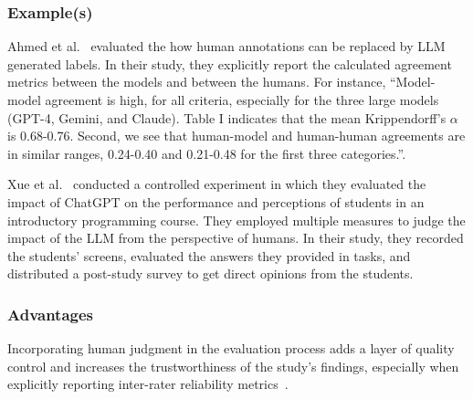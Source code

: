 \subsubsection{Example(s)}

Ahmed et al.~\cite{DBLP:journals/corr/abs-2408-05534} evaluated the how human annotations can be replaced by LLM generated labels.
In their study, they explicitly report the calculated agreement metrics between the models and between the humans.
For instance, ``Model-model agreement is high, for all criteria, especially for the three large models (GPT-4, Gemini, and Claude). Table I indicates that the mean Krippendorff’s $\alpha$ is 0.68-0.76. 
Second, we see that human-model and human-human agreements are in similar ranges, 0.24-0.40 and 0.21-0.48
for the first three categories.''.

Xue et al.~\cite{DBLP:conf/icse/XueCBTH24} conducted a controlled experiment in which they evaluated the impact of ChatGPT on the performance and perceptions of students in an introductory programming course.
They employed multiple measures to judge the impact of the LLM from the perspective of humans.
In their study, they recorded the students' screens, evaluated the answers they provided in tasks, and distributed a post-study survey to get direct opinions from the students.



\subsubsection{Advantages}

Incorporating human judgment in the evaluation process adds a layer of quality control and increases the trustworthiness of the study's findings, especially when explicitly reporting inter-rater reliability metrics~\cite{khraisha2024canlargelanguagemodelshumans}.

